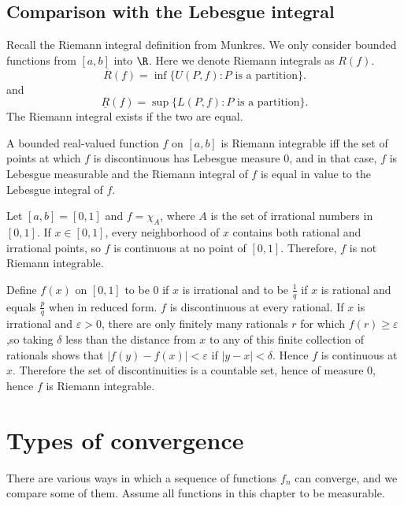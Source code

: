 \begin{sloppypar}
\section{Comparison with the Lebesgue integral}
Recall the Riemann integral definition from Munkres. We only consider bounded functions from $[a,b]$ into $\R$. Here we denote Riemann integrals as $R(f)$.
\[
  \overline{R}(f) = \inf \{U(P,f) : P \text{ is a partition} \} 
.\] and
\[
  \underline{R}(f) = \sup \{L(P,f) : P \text{ is a partition} \} 
.\]
The Riemann integral exists if the two are equal.

\begin{theorem}
  A bounded real-valued function $f$ on $[a,b]$ is Riemann integrable iff the set of points at which $f$ is discontinuous has Lebesgue measure $0$, and in that case, $f$ is Lebesgue measurable and the Riemann integral of $f$ is equal in value to the Lebesgue integral of $f$.
\end{theorem}

\begin{eg}
  Let $[a,b] = [0,1]$ and $f=\chi_A$, where $A$ is the set of irrational numbers in $[0,1]$. If $x \in [0,1]$, every neighborhood of $x$ contains both rational and irrational points, so $f$ is continuous at no point of $[0,1]$. Therefore, $f$ is not Riemann integrable.
\end{eg}

\begin{eg}
  Define $f(x)$ on $[0,1]$ to be $0$ if $x$ is irrational and to be $\frac{1}{q}$ if $x$ is rational and equals $\frac{p}{q}$ when in reduced form. $f$ is discontinuous at every rational. If $x$ is irrational and $ \varepsilon > 0$, there are only finitely many rationals $r$ for which $f(r) \ge \varepsilon$,so taking $\delta$ less than the distance from $x$ to any of this finite collection of rationals shows that $|f(y) - f(x)| < \varepsilon$ if $|y-x| < \delta$. Hence $f$ is continuous at $x$. Therefore the set of discontinuities is a countable set, hence of measure $0$, hence $f$ is Riemann integrable.
\end{eg}

\chapter{Types of convergence}
There are various ways in which a sequence of functions $f_n$ can converge, and we compare some of them. Assume all functions in this chapter to be measurable.


\end{sloppypar}
